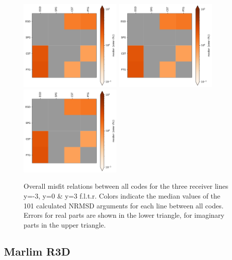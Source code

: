 \documentclass[
    paper,
  ]{geophysics}
\begin{document}
\begin{figure}
	\centering
	\includegraphics[width=5cm]{figures/median-stats-block--3.pdf}\hfill
	\includegraphics[width=5cm]{figures/median-stats-block-0.pdf}\hfill
	\includegraphics[width=5cm]{figures/median-stats-block-3.pdf}
	\caption[Median errors]{Overall misfit relations between all codes for the three receiver lines y=-3, y=0 \& y=3 f.l.t.r. Colors indicate the median values of the 101 calculated NRMSD arguments for each line between all codes. Errors for real parts are shown in the lower triangle, for imaginary parts in the upper triangle.}
	\label{medianmisfits}	
\end{figure}



\clearpage  %
\subsection{Marlim R3D}
\end{document}
